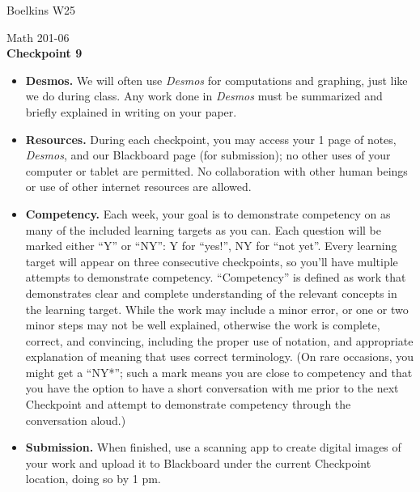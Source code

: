 \documentclass[11 pt]{article}
\begin{document}
 \hfill Boelkins  W25\\
 
\begin{center}
Math 201-06 \\
{\bf Checkpoint 9}
\end{center}



\begin{itemize}
	
	\item {\bf Desmos.} We will often use \emph{Desmos} for computations and graphing, just like we do during class.  Any work done in \emph{Desmos} must be summarized and briefly explained in writing on your paper.  
	
	\item {\bf Resources.} During each checkpoint, you may access your 1 page of notes, \emph{Desmos}, and our Blackboard page (for submission); no other uses of your computer or tablet are permitted.  No collaboration with other human beings or use of other internet resources are allowed.
	
	\item {\bf Competency.} Each week, your goal is to demonstrate competency on as many of the included learning targets as you can.  Each question will be marked either ``Y'' or ``NY'': Y for ``yes!'', NY for ``not yet''.  Every learning target will appear on three consecutive checkpoints, so you'll have multiple attempts to demonstrate competency.  ``Competency'' is defined as work that demonstrates clear and complete understanding of the relevant concepts in the learning target. While the work may include a minor error, or one or two minor steps may not be well explained, otherwise the work is complete, correct, and convincing, including the proper use of notation, and appropriate explanation of meaning that uses correct terminology.  (On rare occasions, you might get a ``NY*''; such a mark means you are close to competency and that you have the option to have a short conversation with me prior to the next Checkpoint and attempt to demonstrate competency through the conversation aloud.)	
	
	\item {\bf Submission.}  When finished, use a scanning app to create digital images of your work and upload it to Blackboard under the current Checkpoint location, doing so by 1 pm.
	
\end{itemize}
\end{document}

